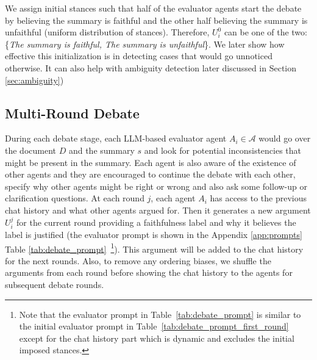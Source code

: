 We assign initial stances such that half of the evaluator agents start the debate by believing the summary is faithful and the other half believing the summary is unfaithful (uniform distribution of stances). Therefore, $U^0_i$ can be one of the two: \{\textit{The summary is faithful, The summary is unfaithful}\}. 
We later show how effective this initialization is in detecting cases that would go unnoticed otherwise.
It can also help with ambiguity detection later discussed in Section \ref{sec:ambiguity})

\subsection{Multi-Round Debate}
During each debate stage, each LLM-based evaluator agent $A_i \in \mathcal{A}$ would go over the document $D$ and the summary $s$ and look for potential inconsistencies that might be present in the summary. Each agent is also aware of the existence of other agents and they are encouraged to continue the debate with each other, specify why other agents might be right or wrong and also ask some follow-up or clarification questions. 
At each round $j$, each agent $A_i$ has access to the previous chat history and what other agents argued for. Then it generates a new argument $U^j_i$ for the current round providing a faithfulness label and why it believes the label is justified (the evaluator prompt is shown in the Appendix \ref{app:prompts} Table \ref{tab:debate_prompt}~\footnote{Note that the evaluator prompt in Table~\ref{tab:debate_prompt} is similar to the initial evaluator prompt in Table~\ref{tab:debate_prompt_first_round} except for the chat history part which is dynamic and excludes the initial imposed stances.}). This argument will be added to the chat history for the next rounds. 
Also, to remove any ordering biases, we shuffle the arguments from each round before showing the chat history to the agents for subsequent debate rounds. 

